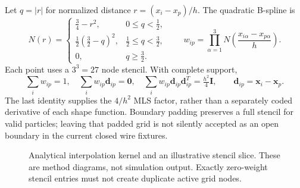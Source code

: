 Let $q=|r|$ for normalized distance $r=(x_i-x_p)/h$. The quadratic B-spline is
\begin{equation}
 N(r)=\begin{cases}
  \tfrac34-r^2,&0\leq q<\tfrac12,\\
  \tfrac12(\tfrac32-q)^2,&\tfrac12\leq q<\tfrac32,\\
  0,&q\geq\tfrac32.
 \end{cases}\qquad
 w_{ip}=\prod_{\alpha=1}^3N\!\left(\frac{x_{i\alpha}-x_{p\alpha}}{h}\right).
 \label{eq:weights}
\end{equation}
Each point uses a $3^3=27$ node stencil. With complete support,
\begin{equation}
 \sum_iw_{ip}=1,\quad \sum_iw_{ip}\mathbf{d}_{ip}=\mathbf{0},\quad
 \sum_iw_{ip}\mathbf{d}_{ip}\mathbf{d}_{ip}^{T}=\tfrac{h^2}{4}\mathbf{I},
 \qquad\mathbf{d}_{ip}=\mathbf{x}_i-\mathbf{x}_p. \label{eq:moment-identities}
\end{equation}
The last identity supplies the $4/h^2$ MLS factor, rather than a separately
coded derivative of each shape function. Boundary padding preserves a full
stencil for valid particles; leaving that padded grid is not silently accepted
as an open boundary in the current closed wire fixtures.

\begin{figure}[htbp]
\centering
{}
\caption{Analytical interpolation kernel and an illustrative stencil slice.
These are method diagrams, not simulation output. Exactly zero-weight stencil
entries must not create duplicate active grid nodes.}
\label{fig:kernel}
\end{figure}

